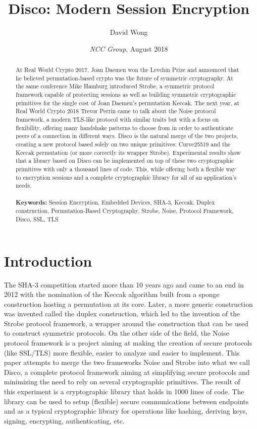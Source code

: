 \documentclass{article}
\title{Disco: Modern Session Encryption}
\author{David Wong}
\date{\emph{NCC Group}, \small{August 2018}}
\begin{document}
\maketitle
\renewcommand{\abstractname}{Abstract}
\begin{abstract}
At Real World Crypto 2017, Joan Daemen won the Levchin Prize and announced that he believed permutation-based crypto was the future of symmetric cryptography. At the same conference Mike Hamburg introduced Strobe, a symmetric protocol framework capable of protecting sessions as well as building symmetric cryptographic primitives for the single cost of Joan Daemen's permutation Keccak. The next year, at Real World Crypto 2018 Trevor Perrin came to talk about the Noise protocol framework, a modern TLS-like protocol with similar traits but with a focus on flexibility, offering many handshake patterns to choose from in order to authenticate peers of a connection in different ways. Disco is the natural merge of the two projects, creating a new protocol based solely on two unique primitives: Curve25519 and the Keccak permutation (or more correctly its wrapper Strobe). Experimental results show that a library based on Disco can be implemented on top of these two cryptographic primitives with only a thousand lines of code. This, while offering both a flexible way to encryption sessions and a complete cryptographic library for all of an application's needs.\\
\\
\textbf{Keywords:} Session Encryption, Embedded Devices, SHA-3, Keccak, Duplex construction, Permutation-Based Cryptography, Strobe, Noise, Protocol Framework, Disco, SSL, TLS\\

\end{abstract}
\vfill

\section{Introduction}\label{introduction}

The SHA-3 competition\cite{sha3} started more than 10 years ago and came to an end in 2012 with the nomination of the Keccak\cite{fips202} algorithm built from a sponge construction hosting a permutation at its core. Later, a more generic construction was invented called the duplex construction\cite{duplex}, which led to the invention of the Strobe protocol framework\cite{strobe}, a wrapper around the construction that can be used to construct symmetric protocols. On the other side of the field, the Noise protocol framework\cite{noise} is a project aiming at making the creation of secure protocols (like SSL/TLS) more flexible, easier to analyze and easier to implement. This paper attempts to merge the two frameworks Noise and Strobe into what we call Disco, a complete protocol framework aiming at simplifying secure protocols and minimizing the need to rely on several cryptographic primitives. The result of this experiment is a cryptographic library that holds in 1000 lines of code. The library can be used to setup (flexible) secure communications between endpoints and as a typical cryptographic library for operations like hashing, deriving keys, signing, encrypting, authenticating, etc.
\end{document}
